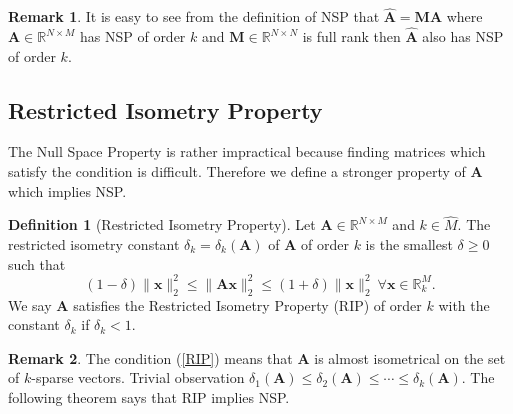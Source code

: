 \documentclass[11pt,american]{book} %
\theoremstyle{plain}
\theoremstyle{definition}
\newtheorem{defn}{Definition}
\newtheorem{rmrk}{Remark}
\begin{document}
\begin{rmrk}
	It is easy to see from the definition of NSP that $\hat{\bm{A}} = \bm{M} \bm{A}$ where $\bm{A} \in \mathbb{R}^{N \times M}$ has NSP of order $k$ and $\bm{M} \in \mathbb{R}^{N \times N}$ is full rank then $\hat{\bm{A}}$ also has NSP of order $k$.
\end{rmrk}
\subsection*{Restricted Isometry Property}
The Null Space Property is rather impractical because finding matrices which satisfy the condition is difficult. Therefore we define a stronger property of $\bm{A}$ which implies NSP.

\begin{defn}[Restricted Isometry Property]
	Let $\bm{A} \in \mathbb{R}^{N \times M}$ and $k \in \hat{M}$. The restricted isometry constant $\delta_k = \delta_k (\bm{A})$ of $\bm{A}$ of order $k$ is the smallest $\delta \geqslant 0$ such that
	\begin{equation}
		(1-\delta)\lVert \bm{x} \rVert_{2}^{2} \leqslant \lVert \bm{A} \bm{x} \rVert_{2}^{2} \leqslant (1+\delta)\lVert \bm{x} \rVert_{2}^{2} \  \forall \bm{x} \in \mathbb{R}^{M}_{k}. \label{RIP}
	\end{equation}
	We say $\bm{A}$ satisfies the Restricted Isometry Property (RIP) of order $k$ with the constant $\delta_k$ if $\delta_k < 1$.
\end{defn}
\pagestyle{headings}

\begin{rmrk}
	The condition (\ref{RIP}) means that $\bm{A}$ is almost isometrical on the set of $k$-sparse vectors. Trivial observation $\delta_1 (\bm{A}) \leqslant \delta_2 (\bm{A})\leqslant \cdots \leqslant \delta_k (\bm{A})$. The following theorem says that RIP implies NSP.
\end{rmrk}
\end{document}
